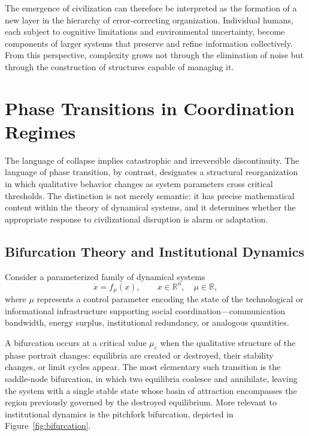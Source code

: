 \documentclass[12pt]{article}
\begin{document}
The emergence of civilization can therefore be interpreted as the formation of a new layer in the hierarchy of error-correcting organization. Individual humans, each subject to cognitive limitations and environmental uncertainty, become components of larger systems that preserve and refine information collectively. From this perspective, complexity grows not through the elimination of noise but through the construction of structures capable of managing it.

\section{Phase Transitions in Coordination Regimes}
\label{sec:phase}

The language of collapse implies catastrophic and irreversible discontinuity. The language of phase transition, by contrast, designates a structural reorganization in which qualitative behavior changes as system parameters cross critical thresholds. The distinction is not merely semantic: it has precise mathematical content within the theory of dynamical systems, and it determines whether the appropriate response to civilizational disruption is alarm or adaptation.

\subsection{Bifurcation Theory and Institutional Dynamics}

Consider a parameterized family of dynamical systems
\[
\dot{x} = f_\mu(x), \qquad x \in \mathbb{R}^n, \quad \mu \in \mathbb{R},
\]
where $\mu$ represents a control parameter encoding the state of the technological or informational infrastructure supporting social coordination---communication bandwidth, energy surplus, institutional redundancy, or analogous quantities.

A bifurcation occurs at a critical value $\mu_c$ when the qualitative structure of the phase portrait changes: equilibria are created or destroyed, their stability changes, or limit cycles appear. The most elementary such transition is the saddle-node bifurcation, in which two equilibria coalesce and annihilate, leaving the system with a single stable state whose basin of attraction encompasses the region previously governed by the destroyed equilibrium. More relevant to institutional dynamics is the pitchfork bifurcation, depicted in Figure~\ref{fig:bifurcation}.
\end{document}
